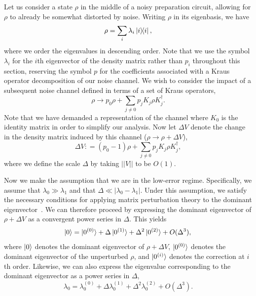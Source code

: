 \documentclass[
amsmath,
amssymb,
aps,
pra,
reprint,
twocolumn,
superscriptaddress,
longbibliography,
showkeys,
floatfix
]{revtex4-1}
\newcommand{\defeq}{\mathrel{\mathop:}=}
\def\ket#1{\ensuremath{\mathinner{|{#1}\rangle}}}
\begin{document}
Let us consider a state $\rho$ in the middle of a noisy preparation circuit,
allowing for $\rho$ to already be somewhat distorted by noise.
Writing $\rho$ in its eigenbasis, we have
\begin{equation}
  \rho = \sum_i \lambda_i \ketbra{i},
\end{equation}
where we order the eigenvalues in descending order.
Note that we use the symbol \(\lambda_i\) for the \(i\)th eigenvector of the density matrix rather than \(p_i\) throughout this section, reserving the symbol \(p\) for the coefficients associated with a Kraus operator decomposition of our noise channel.
We wish to consider the impact of a subsequent noise channel defined in terms of
a set of Kraus operators,
\begin{equation}
  \rho \rightarrow p_0 \rho + \sum_{j \neq 0} p_j K_j \rho K_j^\dagger.
\end{equation}
Note that we have demanded a representation of the channel where \(K_0\) is the
identity matrix in order to simplify our analysis.
Now let \(\Delta V\) denote the change in the density matrix induced by this channel
(\(\rho \rightarrow \rho + \Delta V\)),
\begin{equation}
  \Delta V \defeq (p_0 - 1) \rho + \sum_{j \neq 0} p_j K_j \rho K_j^\dagger,
\end{equation}
where we define the scale \(\Delta\) by taking \(||V||\) to be \(O(1)\). 

Now we make the assumption that we are in the low-error regime. Specifically, we assume that \(\lambda_0 \gg \lambda_1\) and that \(\Delta \ll |\lambda_0 - \lambda_1|\). Under this assumption, we satisfy the necessary conditions for applying matrix perturbation theory to the dominant eigenvector~\cite{Kato2013-tz}. We can therefore proceed by expressing the dominant eigenvector of \(\rho + \Delta V\) as a convergent power series in \(\Delta\).
This yields
\begin{equation}
      \ket{0} = \ket{0^{(0)}} + \Delta \ket{0^{(1)}} +\Delta^2 \ket{0^{(2)}} + O(\Delta^3), \\
\end{equation}
where \(\ket{0}\) denotes the dominant eigenvector of \(\rho + \Delta V\), \(\ket{0^{(0)}}\) denotes the dominant eigenvector of the unperturbed \(\rho\), and \(\ket{0^{(i)}}\) denotes the correction at \(i\)th order.
Likewise, we can also express the eigenvalue corresponding to the dominant eigenvector as a power series in \(\Delta\),
\begin{equation}
    \lambda_0 = \lambda_0^{(0)} + \Delta \lambda_0^{(1)} +  \Delta^2 \lambda_0^{(2)} +  O(\Delta ^3).
\end{equation}
\end{document}
